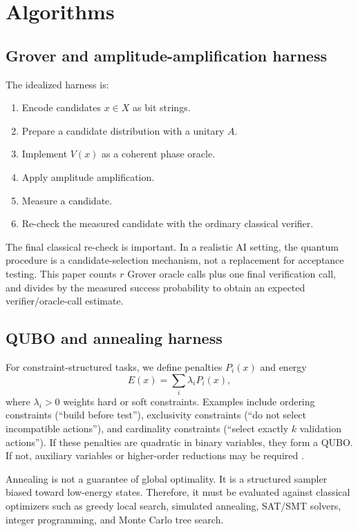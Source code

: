 \documentclass[11pt]{article}
\begin{document}
\section{Algorithms}

\subsection{Grover and amplitude-amplification harness}

The idealized harness is:
\begin{enumerate}
  \item Encode candidates $x\in X$ as bit strings.
  \item Prepare a candidate distribution with a unitary $A$.
  \item Implement $V(x)$ as a coherent phase oracle.
  \item Apply amplitude amplification.
  \item Measure a candidate.
  \item Re-check the measured candidate with the ordinary classical verifier.
\end{enumerate}

The final classical re-check is important. In a realistic AI setting, the quantum procedure is a candidate-selection mechanism, not a replacement for acceptance testing. This paper counts $r$ Grover oracle calls plus one final verification call, and divides by the measured success probability to obtain an expected verifier/oracle-call estimate.

\subsection{QUBO and annealing harness}

For constraint-structured tasks, we define penalties $P_i(x)$ and energy
\begin{equation}
  E(x)=\sum_i \lambda_i P_i(x),
\end{equation}
where $\lambda_i>0$ weights hard or soft constraints. Examples include ordering constraints (``build before test''), exclusivity constraints (``do not select incompatible actions''), and cardinality constraints (``select exactly $k$ validation actions''). If these penalties are quadratic in binary variables, they form a QUBO. If not, auxiliary variables or higher-order reductions may be required \cite{lucas2014ising}.

Annealing is not a guarantee of global optimality. It is a structured sampler biased toward low-energy states. Therefore, it must be evaluated against classical optimizers such as greedy local search, simulated annealing, SAT/SMT solvers, integer programming, and Monte Carlo tree search.
\end{document}
